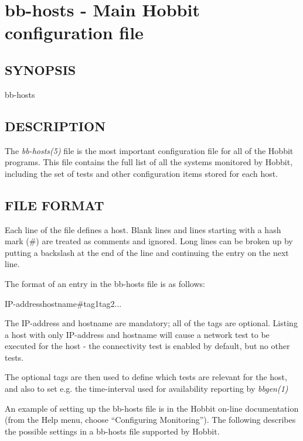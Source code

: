 %
\section{bb-hosts - Main Hobbit configuration file}
 
\subsection{SYNOPSIS}
\begin{description}
\item[bb-hosts]


\end{description}
\subsection{DESCRIPTION}
 The \emph{bb-hosts(5)}
 file is the most important configuration file for all of the Hobbit
 programs. This file contains the full list of all the systems
 monitored by Hobbit, including the set of tests and other
 configuration items stored for each host. 
 
\subsection{FILE FORMAT}
 Each line of the file defines a host. Blank lines and lines starting
 with a hash mark (\#) are treated as comments and ignored. Long lines
 can be broken up by putting a backslash at the end of the line and
 continuing the entry on the next line. 


  The format of an entry in the bb-hosts file is as follows:  
 
IP-addresshostname\#tag1tag2... 


  The IP-address and hostname are mandatory; all of the tags are
  optional. Listing a host with only IP-address and hostname will
  cause a network test to be executed for the host - the connectivity
  test is enabled by default, but no other tests. 



  The optional tags are then used to define which tests are relevant
  for the host, and also to set e.g. the time-interval used for
  availability reporting by \emph{bbgen(1)}




  An example of setting up the bb-hosts file is in the Hobbit on-line
  documentation (from the Help menu, choose ``Configuring
  Monitoring''). The following describes the possible settings in a
  bb-hosts file supported by Hobbit. 



